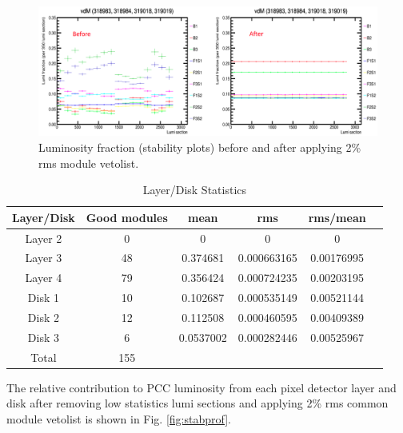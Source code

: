 \begin{figure}[!htp]
\centering
\includegraphics[width=1\textwidth]{ashish_thesis/before_after_vdm_stability.png}
\caption{%
   Luminosity fraction (stability plots) before and after applying 2\% rms module vetolist.
}
\label{fig:b_a_stability_vdm}
\end{figure}









\begin{table}[htbp]
\centering
\label{tab:layer-disk}
\begin{tabular}{cccccc}
\textbf{Layer/Disk} & \textbf{Good modules} & \textbf{mean} & \textbf{rms} & \textbf{rms/mean} \\
\hline
Layer 2 & 0 & 0 & 0 & 0 \\
Layer 3 & 48 & 0.374681 & 0.000663165 & 0.00176995 \\
Layer 4 & 79 & 0.356424 & 0.000724235 & 0.00203195 \\
Disk 1 & 10 & 0.102687 & 0.000535149 & 0.00521144 \\
Disk 2 & 12 & 0.112508 & 0.000460595 & 0.00409389 \\
Disk 3 & 6 & 0.0537002 & 0.000282446 & 0.00525967 \\
Total  & 155 & & \\
\end{tabular}
\caption{Layer/Disk Statistics}
\end{table}




The relative contribution to PCC luminosity from each pixel detector layer and disk after removing low statistics lumi sections and applying 2\% rms common module vetolist is shown in Fig. \ref{fig:stabprof}.

